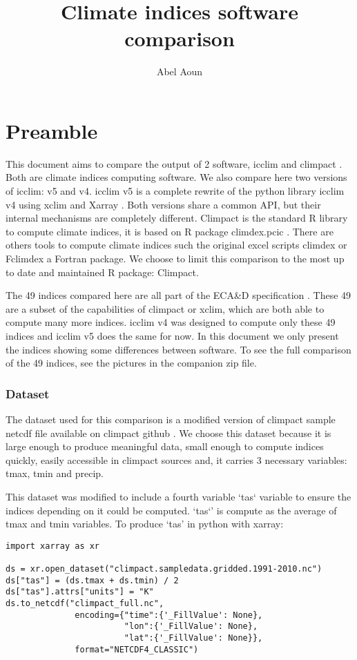 \documentclass[a4paper,11pt]{article}
\title{Climate indices software comparison}
\author{Abel Aoun}
\begin{document}
\maketitle
\part*{Preamble}
    This document aims to compare the output of 2 software, icclim \cite{gh/icclim} and climpact \cite{gh/climpact}. Both are climate indices computing software.
    We also compare here two versions of icclim: v5 and v4.
    icclim v5 is a complete rewrite of the python library icclim v4 using xclim \cite{gh/xclim} and Xarray \cite{gh/xarray}. Both versions share a common API, but their internal mechanisms are completely different.
    Climpact is the standard R library to compute climate indices, it is based on R package climdex.pcic \cite{gh/climdex}.
    There are others tools to compute climate indices such the original excel scripts climdex \cite{doc/climdex} or Fclimdex \cite{gh/fclimdex} a Fortran package.
    We choose to limit this comparison to the most up to date and maintained R package: Climpact.

    The 49 indices compared here are all part of the ECA\&D specification \cite{doc/ecad_new}.
    These 49 are a subset of the capabilities of climpact or xclim, which are both able to compute many more indices.
    icclim v4 was designed to compute only these 49 indices and icclim v5 does the same for now.
    In this document we only present the indices showing some differences between software.
    To see the full comparison of the 49 indices, see the pictures in the companion zip file.

    \section{Dataset}
        The dataset used for this comparison is a modified version of climpact sample netcdf file available on climpact github \cite{gh/climpact}.
        We choose this dataset because it is large enough to produce meaningful data, small enough to compute indices quickly, 
        easily accessible in climpact sources and, it carries 3 necessary variables: tmax, tmin and precip.

        This dataset was modified to include a fourth variable `tas` variable to ensure the indices depending on it could be computed.
        `tas`' is compute as the average of tmax and tmin variables.
        To produce `tas' in python with xarray:
        \begin{minipage}{\linewidth}
        \begin{lstlisting}
import xarray as xr

ds = xr.open_dataset("climpact.sampledata.gridded.1991-2010.nc")
ds["tas"] = (ds.tmax + ds.tmin) / 2
ds["tas"].attrs["units"] = "K"
ds.to_netcdf("climpact_full.nc",
              encoding={"time":{'_FillValue': None},
                        "lon":{'_FillValue': None},
                        "lat":{'_FillValue': None}},
              format="NETCDF4_CLASSIC")
        \end{lstlisting}
        \end{minipage}
\end{document}
